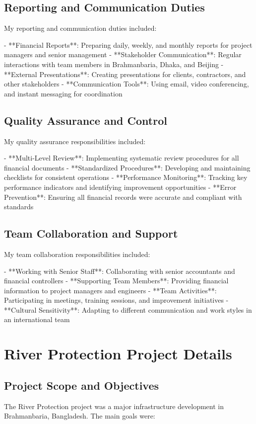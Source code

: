 \subsection{Reporting and Communication Duties}
My reporting and communication duties included:

- **Financial Reports**: Preparing daily, weekly, and monthly reports for project managers and senior management
- **Stakeholder Communication**: Regular interactions with team members in Brahmanbaria, Dhaka, and Beijing
- **External Presentations**: Creating presentations for clients, contractors, and other stakeholders
- **Communication Tools**: Using email, video conferencing, and instant messaging for coordination

\subsection{Quality Assurance and Control}
My quality assurance responsibilities included:

- **Multi-Level Review**: Implementing systematic review procedures for all financial documents
- **Standardized Procedures**: Developing and maintaining checklists for consistent operations
- **Performance Monitoring**: Tracking key performance indicators and identifying improvement opportunities
- **Error Prevention**: Ensuring all financial records were accurate and compliant with standards

\subsection{Team Collaboration and Support}
My team collaboration responsibilities included:

- **Working with Senior Staff**: Collaborating with senior accountants and financial controllers
- **Supporting Team Members**: Providing financial information to project managers and engineers
- **Team Activities**: Participating in meetings, training sessions, and improvement initiatives
- **Cultural Sensitivity**: Adapting to different communication and work styles in an international team

\section{River Protection Project Details}

\subsection{Project Scope and Objectives}
The River Protection project was a major infrastructure development in Brahmanbaria, Bangladesh. The main goals were:

